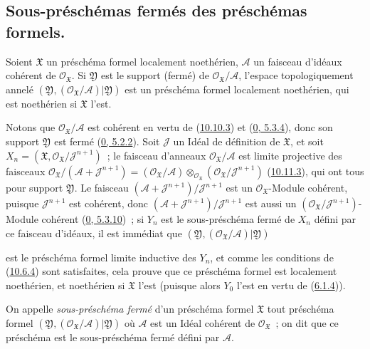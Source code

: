 \subsection{Sous-préschémas fermés des préschémas formels.}
\label{subsection:I.10.14-fr}

\begin{proposition}[10.14.1]
\label{I.10.14.1-fr}
Soient $\mathfrak{X}$ un préschéma formel localement noethérien,
$\mathscr{A}$ un faisceau d'idéaux cohérent de
$\mathscr{O}_{\mathfrak{X}}$. Si $\mathfrak{Y}$ est le support (fermé) de
$\mathscr{O}_{\mathfrak{X}}/\mathscr{A}$, l'espace topologiquement annelé
$(\mathfrak{Y},(\mathscr{O}_{\mathfrak{X}}/\mathscr{A})|\mathfrak{Y})$ est
un préschéma formel localement noethérien, qui est noethérien si
$\mathfrak{X}$ l'est.
\end{proposition}

Notons que $\mathscr{O}_{\mathfrak{X}}/\mathscr{A}$ est cohérent en vertu de
(\hyperref[I.10.10.3-fr]{10.10.3}) et
(\hyperref[0.5.3.4-fr]{0, 5.3.4}), donc son support $\mathfrak{Y}$ est fermé
(\hyperref[0.5.2.2-fr]{0, 5.2.2}). Soit $\mathscr{J}$ un Idéal de définition
de $\mathfrak{X}$, et soit
$X_n=(\mathfrak{X},\mathscr{O}_{\mathfrak{X}}/\mathscr{J}^{n+1})$~; le
faisceau d'anneaux $\mathscr{O}_{\mathfrak{X}}/\mathscr{A}$ est limite
projective des faisceaux
$\mathscr{O}_{\mathfrak{X}}/(\mathscr{A}+\mathscr{J}^{n+1})
=(\mathscr{O}_{\mathfrak{X}}/\mathscr{A})
\otimes_{\mathscr{O}_{\mathfrak{X}}}
(\mathscr{O}_{\mathfrak{X}}/\mathscr{J}^{n+1})$
(\hyperref[I.10.11.3-fr]{10.11.3}), qui ont tous pour support
$\mathfrak{Y}$. Le faisceau
$(\mathscr{A}+\mathscr{J}^{n+1})/\mathscr{J}^{n+1}$ est un
$\mathscr{O}_{\mathfrak{X}}$-Module cohérent, puisque
$\mathscr{J}^{n+1}$ est cohérent, donc
$(\mathscr{A}+\mathscr{J}^{n+1})/\mathscr{J}^{n+1}$ est aussi un
$(\mathscr{O}_{\mathfrak{X}}/\mathscr{J}^{n+1})$-Module cohérent
(\hyperref[0.5.3.10-fr]{0, 5.3.10})~; si $Y_n$ est le sous-préschéma fermé
de $X_n$ défini par ce faisceau d'idéaux, il est immédiat que
$(\mathfrak{Y},(\mathscr{O}_{\mathfrak{X}}/\mathscr{A})|\mathfrak{Y})$

est le préschéma formel limite inductive des $Y_n$, et comme les conditions de
(\hyperref[I.10.6.4-fr]{10.6.4}) sont satisfaites, cela prouve que ce préschéma
formel est localement noethérien, et noethérien si $\mathfrak{X}$ l'est (puisque
alors $Y_0$ l'est en vertu de (\hyperref[I.6.1.4-fr]{6.1.4})).

\begin{definition}[10.14.2]
\label{I.10.14.2-fr}
On appelle \emph{sous-préschéma fermé} d'un préschéma formel $\mathfrak{X}$ tout
préschéma formel
$(\mathfrak{Y},(\mathscr{O}_{\mathfrak{X}}/\mathscr{A})|\mathfrak{Y})$ où
$\mathscr{A}$ est un Idéal cohérent de $\mathscr{O}_{\mathfrak{X}}$~; on dit que ce
préschéma est le sous-préschéma fermé défini par $\mathscr{A}$.
\end{definition}

